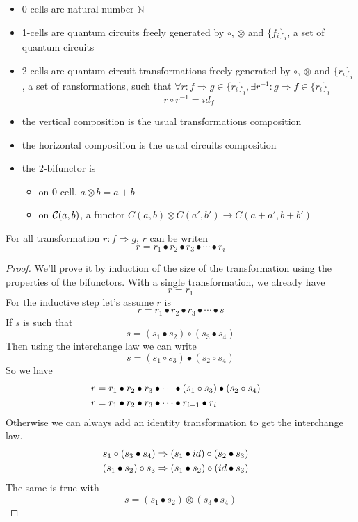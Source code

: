 \documentclass[a4paper]{article}
\begin{document}
\begin{itemize}
\item 0-cells are natural number $\mathbb{N}$
\item 1-cells are quantum circuits freely generated by $\circ$, $\otimes$ and $\{f_i\}_i$, a set of quantum circuits
\item 2-cells are quantum circuit transformations freely generated by $\circ$, $\otimes$ and $\{r_i\}_i$, a set of ransformations, such that $\forall r: f \Rightarrow g \in \{r_i\}_i, \exists r^{-1}: g \Rightarrow f \in \{r_i\}_i$
\[
r \circ r^{-1} = id_f
\]
\item the vertical composition is the usual transformations composition
\item the horizontal composition is the usual circuits composition
\item the 2-bifunctor is
\begin{itemize}
\item on 0-cell, $a \otimes b = a + b$
\item on ${\cal C}(a, b)$, a functor $C(a, b) \otimes C(a', b') \to C(a + a', b + b')$
\end{itemize}
\end{itemize}

\begin{proposition}
For all transformation $r: f \Rightarrow g$, $r$ can be writen
\[
r = r_1 \bullet r_2 \bullet r_3 \bullet \cdots \bullet r_i
\]

\begin{proof}
We'll prove it by induction of the size of the transformation using the properties of the bifunctors.
With a single transformation, we already have
\[
r = r_1
\]
For the inductive step let's assume $r$ is
\[
r = r_1 \bullet r_2 \bullet r_3 \bullet \cdots \bullet s
\]
If $s$ is such that
\[
s = (s_1 \bullet s_2) \circ (s_3 \bullet s_4)
\]
Then using the interchange law we can write
\[
s = (s_1 \circ s_3) \bullet (s_2 \circ s_4)
\]
So we have 
\begin{align}
r &= r_1 \bullet r_2 \bullet r_3 \bullet \cdots \bullet (s_1 \circ s_3) \bullet (s_2 \circ s_4) \cr
r &= r_1 \bullet r_2 \bullet r_3 \bullet \cdots \bullet r_{i - 1} \bullet r_i
\end{align}
Otherwise we can always add an identity transformation to get the interchange law.
\begin{align}
s_1 \circ (s_3 \bullet s_4) &\Rightarrow (s_1 \bullet id) \circ (s_2 \bullet s_3) \cr
(s_1 \bullet s_2) \circ s_3 &\Rightarrow (s_1 \bullet s_2) \circ (id \bullet s_3)
\end{align}
The same is true with
\[
s = (s_1 \bullet s_2) \otimes (s_3 \bullet s_4)
\]
\end{proof}
\end{proposition}
\end{document}
